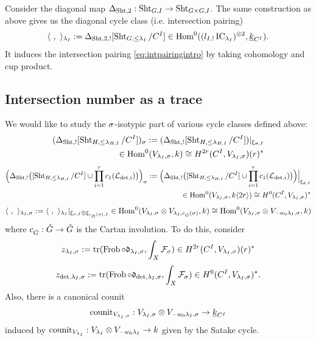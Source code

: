 \documentclass[reqno]{amsart}
\numberwithin{equation}{section}
\numberwithin{equation}{section}
\begin{document}
Consider the diagonal map $\Delta_{\operatorname{Sht},2}:\operatorname{Sht}_{G,I}\to\operatorname{Sht}_{G\times G,I}$. The same construction as above gives us the diagonal cycle class (i.e. intersection pairing) \begin{equation}\label{eq:intpairing}
    \langle~,~\rangle_{\lambda_I}:=\Delta_{\operatorname{Sht},2,!}[\operatorname{Sht}_{G,\leq\lambda_I}/C^I]\in \operatorname{Hom}^0((l_{I,!}\operatorname{IC}_{\lambda_I})^{\otimes 2}, \underline{k}_{C^I}).
\end{equation} It induces the intersection pairing \eqref{eq:intpairingintro} by taking cohomology and cup product.

\subsection{Intersection number as a trace}

We would like to study the $\sigma$-isotypic part of various cycle classes defined above: \begin{equation}\begin{split}
    (\Delta_{\operatorname{Sht},!}[\operatorname{Sht}_{H,\leq\lambda_{H,I}}/C^I])_{\sigma}:=(\Delta_{\operatorname{Sht},!}[\operatorname{Sht}_{H,\leq\lambda_{H,I}}/C^I])|_{\xi_{\sigma,I}} \\ \in \operatorname{Hom}^0(V_{\lambda_I,\sigma}, k) \cong H^{2r}(C^I,V_{\lambda_I,\sigma})(r)^*
\end{split}\end{equation}
\begin{equation}\begin{split}
    \Bigl(\Delta_{\operatorname{Sht},!}\bigl([\operatorname{Sht}_{H,\leq\lambda_{H,I}}/C^I]\cup \prod_{i=1}^r c_1(\mathcal{L}_{\det,i})\bigr)\Bigr)_{\sigma}:=\Bigl(\Delta_{\operatorname{Sht},!}\bigl([\operatorname{Sht}_{H,\leq\lambda_{H,I}}/C^I]\cup \prod_{i=1}^r c_1(\mathcal{L}_{\det,i})\bigr)\Bigr)\Big|_{\xi_{\sigma,I}} \\ \in \operatorname{Hom}^0(V_{\lambda_I,\sigma}, k\langle 2r\rangle) \cong H^0(C^I,V_{\lambda_I,\sigma})^*
\end{split}\end{equation}
\begin{equation}
    \langle~,~\rangle_{\lambda_I,\sigma}:=\langle~,~\rangle_{\lambda_I}|_{\xi_{\sigma,I}\otimes \xi_{c_{\check{G}}(\sigma),I}}\in \operatorname{Hom}^0(V_{\lambda_I,\sigma}\otimes V_{\lambda_I,c_{\check{G}}(\sigma)}, k)\cong \operatorname{Hom}^0(V_{\lambda_I,\sigma}\otimes V_{-w_0\lambda_I,\sigma}, k)
\end{equation} where $c_{\check{G}}:\check{G}\to \check{G}$ is the Cartan involution. To do this, consider \begin{equation}
    z_{\lambda_I,\sigma} := \operatorname{tr}(\operatorname{Frob}\circ \mathfrak{d}_{\lambda_I,\sigma}, \int_X\mathcal{F}_{\sigma})\in H^{2r}(C^I,V_{\lambda_I,\sigma})(r)^*
\end{equation}
\begin{equation}
    z_{\det,\lambda_I,\sigma} := \operatorname{tr}(\operatorname{Frob}\circ \mathfrak{d}_{\det,\lambda_I,\sigma}, \int_X\mathcal{F}_{\sigma} )\in H^0(C^I, V_{\lambda_I,\sigma})^*.
\end{equation} Also, there is a canonical counit \begin{equation}
    \mathrm{counit}_{V_{\lambda_I,\sigma}}:V_{\lambda_I,\sigma}\otimes V_{-w_0\lambda_I,\sigma}\to \underline{k}_{C^I}
\end{equation} induced by $\mathrm{counit}_{V_{\lambda_I}}:V_{\lambda_I}\otimes V_{-w_0\lambda_I}\to k$ given by the Satake cycle.
\end{document}

